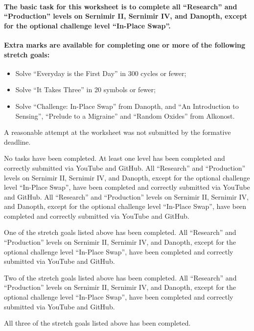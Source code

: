 \documentclass{../../../fal_assignment}
\begin{document}
\paragraph{
The basic task for this worksheet is to complete \textbf{all} ``Research'' and ``Production'' levels on Sernimir II, Sernimir IV, and Danopth, except for the optional challenge level ``In-Place Swap''.
}

\paragraph{
Extra marks are available for completing one or more of the following stretch goals:
}
	\begin{itemize}
		\item Solve ``Everyday is the First Day'' in 300 cycles or fewer;
		\item Solve ``It Takes Three'' in 20 symbols or fewer;
		\item Solve ``Challenge: In-Place Swap'' from Danopth, and ``An Introduction to Sensing'', ``Prelude to a Migraine'' and ``Random Oxides'' from Alkonost.
	\end{itemize}

\rubrichead{\hspace{1em}}
\begin{markingrubric}
		\grade\fail	A reasonable attempt at the worksheet was not submitted by the formative deadline.
		
        \grade\fail No tasks have been completed.
        \grade At least one level has been completed and correctly submitted via YouTube and GitHub.
        \grade All ``Research'' and ``Production'' levels on Sernimir II, Sernimir IV, and Danopth, except for the optional challenge level ``In-Place Swap'', have been completed and correctly submitted via YouTube and GitHub.
        \grade All ``Research'' and ``Production'' levels on Sernimir II, Sernimir IV, and Danopth, except for the optional challenge level ``In-Place Swap'', have been completed and correctly submitted via YouTube and GitHub.
            \par One of the stretch goals listed above has been completed.
        \grade All ``Research'' and ``Production'' levels on Sernimir II, Sernimir IV, and Danopth, except for the optional challenge level ``In-Place Swap'', have been completed and correctly submitted via YouTube and GitHub.
            \par Two of the stretch goals listed above has been completed.
        \grade All ``Research'' and ``Production'' levels on Sernimir II, Sernimir IV, and Danopth, except for the optional challenge level ``In-Place Swap'', have been completed and correctly submitted via YouTube and GitHub.
            \par All three of the stretch goals listed above has been completed.
\end{markingrubric}
\end{document}
